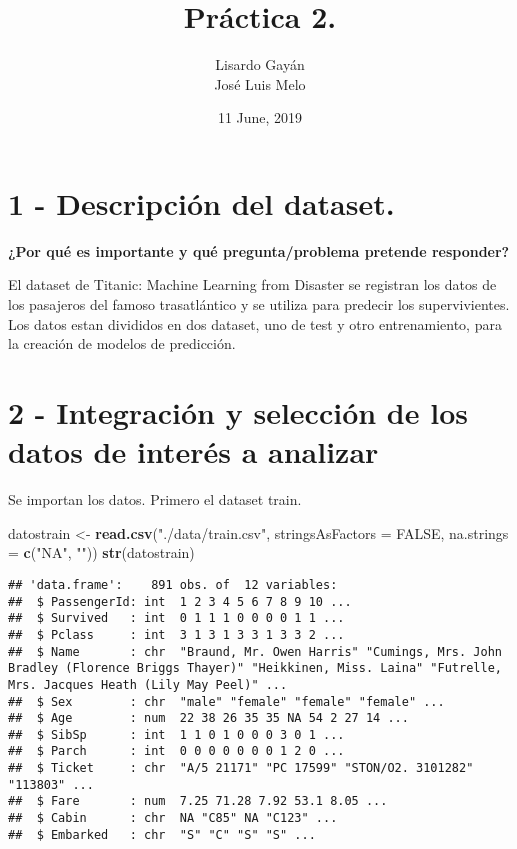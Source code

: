 \documentclass[]{article}
\title{Práctica 2.}
\author{Lisardo Gayán \\ José Luis Melo}
\date{11 June, 2019}
\newenvironment{Shaded}{\begin{snugshade}}{\end{snugshade}}
\newcommand{\KeywordTok}[1]{\textcolor[rgb]{0.13,0.29,0.53}{\textbf{#1}}}
\newcommand{\DataTypeTok}[1]{\textcolor[rgb]{0.13,0.29,0.53}{#1}}
\newcommand{\StringTok}[1]{\textcolor[rgb]{0.31,0.60,0.02}{#1}}
\newcommand{\OtherTok}[1]{\textcolor[rgb]{0.56,0.35,0.01}{#1}}
\newcommand{\NormalTok}[1]{#1}
\begin{document}
\maketitle

{
\setcounter{tocdepth}{3}
\tableofcontents
}
\section{1 - Descripción del dataset.}\label{descripcion-del-dataset.}

\textbf{¿Por qué es importante y qué pregunta/problema pretende
responder?}

El dataset de Titanic: Machine Learning from Disaster se registran los
datos de los pasajeros del famoso trasatlántico y se utiliza para
predecir los supervivientes. Los datos estan divididos en dos dataset,
uno de test y otro entrenamiento, para la creación de modelos de
predicción.

\section{2 - Integración y selección de los datos de interés a
analizar}\label{integracion-y-seleccion-de-los-datos-de-interes-a-analizar}

Se importan los datos. Primero el dataset train.

\begin{Shaded}
\begin{Highlighting}[]
\NormalTok{datostrain <-}\StringTok{ }\KeywordTok{read.csv}\NormalTok{(}\StringTok{"./data/train.csv"}\NormalTok{, }\DataTypeTok{stringsAsFactors =} \OtherTok{FALSE}\NormalTok{, }\DataTypeTok{na.strings =} \KeywordTok{c}\NormalTok{(}\StringTok{"NA"}\NormalTok{, }\StringTok{""}\NormalTok{))}
\KeywordTok{str}\NormalTok{(datostrain)}
\end{Highlighting}
\end{Shaded}

\begin{verbatim}
## 'data.frame':    891 obs. of  12 variables:
##  $ PassengerId: int  1 2 3 4 5 6 7 8 9 10 ...
##  $ Survived   : int  0 1 1 1 0 0 0 0 1 1 ...
##  $ Pclass     : int  3 1 3 1 3 3 1 3 3 2 ...
##  $ Name       : chr  "Braund, Mr. Owen Harris" "Cumings, Mrs. John Bradley (Florence Briggs Thayer)" "Heikkinen, Miss. Laina" "Futrelle, Mrs. Jacques Heath (Lily May Peel)" ...
##  $ Sex        : chr  "male" "female" "female" "female" ...
##  $ Age        : num  22 38 26 35 35 NA 54 2 27 14 ...
##  $ SibSp      : int  1 1 0 1 0 0 0 3 0 1 ...
##  $ Parch      : int  0 0 0 0 0 0 0 1 2 0 ...
##  $ Ticket     : chr  "A/5 21171" "PC 17599" "STON/O2. 3101282" "113803" ...
##  $ Fare       : num  7.25 71.28 7.92 53.1 8.05 ...
##  $ Cabin      : chr  NA "C85" NA "C123" ...
##  $ Embarked   : chr  "S" "C" "S" "S" ...
\end{verbatim}
\end{document}
